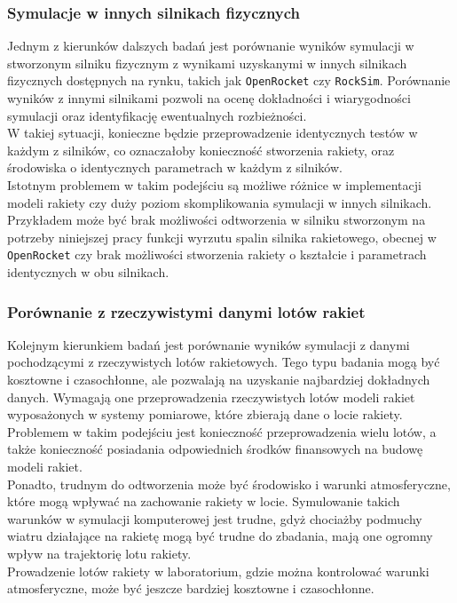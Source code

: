 \subsubsection{Symulacje w innych silnikach fizycznych}

Jednym z kierunków dalszych badań jest porównanie wyników symulacji w
stworzonym silniku fizycznym z wynikami uzyskanymi w innych silnikach
fizycznych dostępnych na rynku, takich jak \texttt{OpenRocket} czy
\texttt{RockSim}. Porównanie wyników z innymi silnikami pozwoli na ocenę
dokładności i wiarygodności symulacji oraz identyfikację ewentualnych
rozbieżności. \\W takiej sytuacji, konieczne będzie przeprowadzenie
identycznych testów w każdym z silników, co oznaczałoby konieczność
stworzenia rakiety, oraz środowiska o identycznych parametrach w każdym z
silników. \\Istotnym problemem w takim podejściu są możliwe różnice w
implementacji modeli rakiety czy duży poziom
skomplikowania symulacji w innych silnikach. Przykładem może być brak
możliwości
odtworzenia
w silniku stworzonym na potrzeby niniejszej pracy funkcji wyrzutu spalin
silnika rakietowego, obecnej w \texttt{OpenRocket} czy brak możliwości stworzenia rakiety o
kształcie i parametrach identycznych w obu silnikach.

\subsubsection{Porównanie z rzeczywistymi danymi lotów rakiet}

Kolejnym kierunkiem badań jest porównanie wyników symulacji z
danymi pochodzącymi z rzeczywistych lotów rakietowych. Tego typu badania
mogą być kosztowne i czasochłonne, ale pozwalają na uzyskanie najbardziej
dokładnych danych. Wymagają one przeprowadzenia rzeczywistych lotów modeli
rakiet wyposażonych w systemy pomiarowe, które zbierają dane o locie rakiety.\\
Problemem w takim podejściu jest konieczność przeprowadzenia wielu lotów, a
także konieczność posiadania odpowiednich środków finansowych na budowę
modeli rakiet. \\Ponadto, trudnym do odtworzenia może być środowisko i
warunki atmosferyczne, które mogą wpływać na zachowanie rakiety w locie.
Symulowanie takich warunków w symulacji komputerowej jest trudne, gdyż
chociażby podmuchy wiatru działające na rakietę mogą być trudne do zbadania,
mają one ogromny wpływ na trajektorię lotu rakiety.\\ Prowadzenie lotów
rakiety w laboratorium, gdzie można kontrolować warunki atmosferyczne, może
być jeszcze bardziej kosztowne i czasochłonne.

